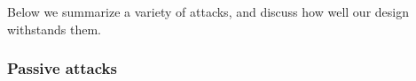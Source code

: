 \documentclass[times,10pt,twocolumn]{article}
\begin{document}
\label{sec:attacks}


  
Below we summarize a variety of attacks, and discuss how well our
design withstands them.

\subsubsection*{Passive attacks}
\end{document}

